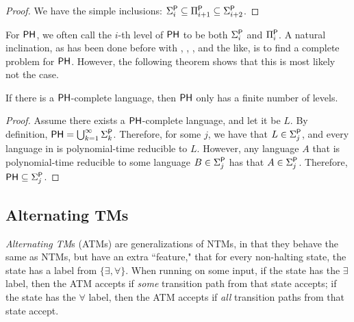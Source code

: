 \begin{proof}
We have the simple inclusions: $\Sigma_i^\P \subseteq \Pi_{i+1}^\P \subseteq \Sigma_{i+2}^\P$.
\end{proof}

For $\PH$, we often call the $i$-th level of $\PH$ to be both $\Sigma_i^\text{\P}$ and $\Pi_i^\text{\P}$. A natural inclination, as has been done before with \NP, \PSPACE, \NL, and the like, is to find a complete problem for $\PH$. However, the following theorem shows that this is most likely not the case.

\begin{theorem}
If there is a $\PH$-complete language, then $\PH$ only has a finite number of levels.
\end{theorem}

\begin{proof}
Assume there exists a $\PH$-complete language, and let it be $L$. By definition, $\PH = \bigcup_{k = 1}^{\infty} \Sigma_k^{\text{\P}}$. Therefore, for some $j$, we have that $L \in \Sigma_j^\P$, and every language in \PH is polynomial-time reducible to $L$. However, any language $A$ that is polynomial-time reducible to some language $B \in \Sigma_j^\P$ has that $A \in \Sigma_j^\P$. Therefore, $\PH \subseteq \Sigma_j^\P$.
\end{proof}

\subsection{Alternating TMs}
\begin{definition}
\emph{Alternating TM}s (ATMs) are generalizations of NTMs, in that they behave the same as NTMs, but have an extra ``feature," that for every non-halting state, the state has a label from $\{\exists, \forall\}$. When running on some input, if the state has the $\exists$ label, then the ATM accepts if \emph{some} transition path from that state accepts; if the state has the $\forall$ label, then the ATM accepts if \emph{all} transition paths from that state accept.
\end{definition}